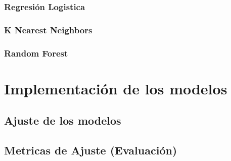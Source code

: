 \subsubsection{Regresión Logistica}

\blindtext

\subsubsection{K Nearest Neighbors}

\blindtext

\subsubsection{Random Forest}

\blindtext

\section{Implementación de los modelos}

\blindtext

\subsection{Ajuste de los modelos}

\blindtext

\subsection{Metricas de Ajuste (Evaluación)}

\blindtext
